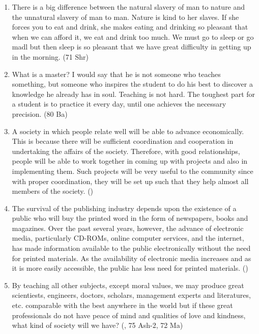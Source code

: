 \documentclass[12pt]{article}
\begin{document}
\begin{enumerate}
    \item There is a big difference between the natural slavery of man to nature and the unnatural slavery of man to man. Nature is kind to her slaves. If she forces you to eat and drink, she makes eating and drinking so pleasant that when we can afford it, we eat and drink too much. We must go to sleep or go madl but then sleep is so pleasant that we have great difficulty in getting up in the morning. \hfill (71 Shr)

    \item What is a master? I would say that he is not someone who teaches something, but someone who inspires the student to do his best to discover a knowledge he already has in soul. Teaching is not hard. The toughest part for a student is to practice it every day, until one achieves the necessary precision. \hfill (80 Ba)

    \item A society in which people relate well will be able to advance economically. This is because there will be sufficient coordination and cooperation in undertaking the affairs of the society. Therefore, with good relationships, people will be able to work together in coming up with projects and also in implementing them. Such projects will be very useful to the community since with proper coordination, they will be set up such that they help almost all members of the society. \hfill ()
      
    \item The survival of the publishing industry depends upon the existence of a public who will buy the printed word in the form of newspapers, books and magazines. Over the past several years, however, the advance of electronic media, particularly CD-ROMs, online computer services, and the internet, has made information available to the public electronically without the need for printed materials. As the availability of electronic media increases and as it is more easily accessible, the public has less need for printed materials. \hfill ()

    \item By teaching all other subjects, except moral values, we may produce great scientiests, engineers, doctors, scholars, management experts and literatures, etc. comparable with the best anywhere in the world but if these great professionals do not have peace of mind and qualities of love and kindness, what kind of society will we have? \hfill (, 75 Ash-2, 72 Ma)


\end{enumerate}
\end{document}
